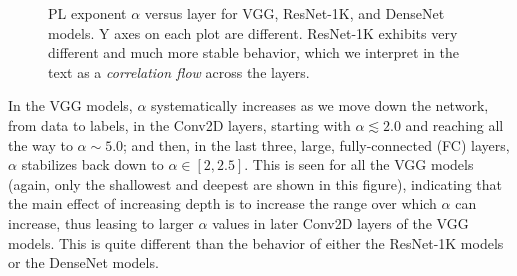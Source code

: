 \begin{figure}[t]
    \centering

    \qquad
    \qquad
    \caption{PL exponent $\alpha$ versus layer for VGG, ResNet-1K, and DenseNet models.  Y axes on each plot are different.  ResNet-1K exhibits very different and much more stable behavior, which we interpret in the text as a \emph{correlation flow} across the layers.  }
    \label{fig:vgg-alpha-layers}
\end{figure}

In the VGG models, $\alpha$ systematically increases as we move down the network, from data to labels, in the Conv2D layers, starting with $\alpha\lesssim 2.0$ and reaching all the way to $\alpha\sim 5.0$; and then, in the last three, large, fully-connected (FC) layers, $\alpha$ stabilizes back down to $\alpha\in[2,2.5]$.
This is seen for all the VGG models (again, only the shallowest and deepest are shown in this figure), indicating that the main effect of increasing depth is to increase the range over which $\alpha$ can increase, thus leasing to larger $\alpha$ values in later Conv2D layers of the VGG models.
This is quite different than the behavior of either the ResNet-1K models or the DenseNet models.

